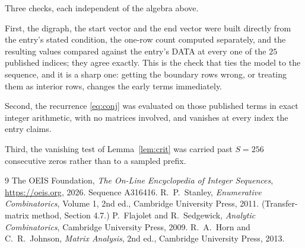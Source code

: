 \documentclass[11pt,a4paper]{article}
\theoremstyle{plain}
\theoremstyle{definition}
\begin{document}
Three checks, each independent of the algebra above.

First, the digraph, the start vector and the end vector were built directly from the
entry's stated condition, the one-row count computed separately, and the resulting values
compared against the entry's DATA at every one of the $25$ published indices; they
agree exactly. This is the check that ties the model to the sequence, and it is a sharp one:
getting the boundary rows wrong, or treating them as interior rows, changes the early terms
immediately.

Second, the recurrence \eqref{eq:conj} was evaluated on those published terms in exact
integer arithmetic, with no matrices involved, and vanishes at every index the entry claims.

Third, the vanishing test of Lemma~\ref{lem:crit} was carried past $S=256$ consecutive
zeros rather than to a sampled prefix.

\begin{thebibliography}{9}
 The OEIS Foundation, \emph{The On-Line Encyclopedia of Integer
Sequences}, \url{https://oeis.org}, 2026. Sequence A316416.
 R.~P.~Stanley, \emph{Enumerative Combinatorics}, Volume 1, 2nd ed.,
Cambridge University Press, 2011. (Transfer-matrix method, Section 4.7.)
 P.~Flajolet and R.~Sedgewick, \emph{Analytic Combinatorics}, Cambridge
University Press, 2009.
 R.~A.~Horn and C.~R.~Johnson, \emph{Matrix Analysis}, 2nd ed., Cambridge
University Press, 2013.
\end{thebibliography}
\end{document}
